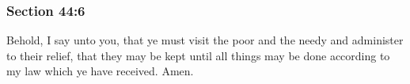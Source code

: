 
	\subsubsection{Section 44:6} %
		\label{DC44-6}

		Behold, I say unto you, that ye must visit the poor and the needy and administer to their relief, that they may be kept until all things may be done according to my law which ye have received.  Amen.

